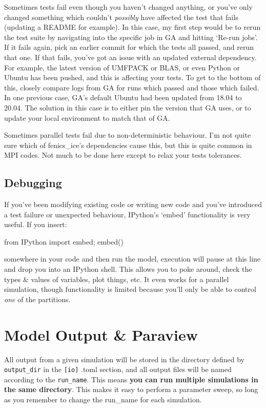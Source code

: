 \documentclass[11pt, reqno, nocenter]{article}
\begin{document}
Sometimes tests fail even though you haven't changed anything, or you've only changed something which couldn't \emph{possibly} have affected the test that fails (updating a README for example). In this case, my first step would be to rerun the test suite by navigating into the specific job in GA and hitting `Re-run jobs'. If it fails again, pick an earlier commit for which the tests all passed, and rerun that one. If that fails, you've got an issue with an updated external dependency. For example, the latest version of UMFPACK or BLAS, or even Python or Ubuntu has been pushed, and this is affecting your tests. To get to the bottom of this, closely compare logs from GA for runs which passed and those which failed. In one previous case, GA's default Ubuntu had been updated from 18.04 to 20.04. The solution in this case is to either pin the version that GA uses, or to update your local environment to match that of GA.

Sometimes parallel tests fail due to non-deterministic behaviour. I'm not quite sure which of fenics\_ice's dependencies cause this, but this is quite common in MPI codes. Not much to be done here except to relax your tests tolerances.

\subsection{Debugging}

If you've been modifying existing code or writing new code and you've introduced a test failure or unexpected behaviour, IPython's `embed' functionality is very useful. If you insert:

\begin{spverbatim}
from IPython import embed; embed()
\end{spverbatim}

somewhere in your code and then run the model, execution will pause at this line and drop you into an IPython shell. This allows you to poke around, check the types \& values of variables, plot things, etc. It even works for a parallel simulation, though functionality is limited because you'll only be able to control \emph{one} of the partitions.
\section{Model Output \& Paraview} \label{sec:output}

All output from a given simulation will be stored in the directory defined by \texttt{output\_dir} in the \texttt{[io]} .toml section, and all output files will be named according to the \texttt{run\_name}. This means \textbf{you can run multiple simulations in the same directory}. This makes it easy to perform a parameter sweep, so long as you remember to change the run\_name for each simulation.
\end{document}
